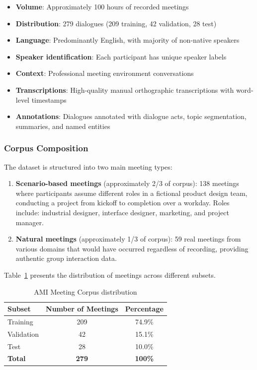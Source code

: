 \documentclass[12pt]{article}
\begin{document}
\begin{itemize}
    \item \textbf{Volume}: Approximately 100 hours of recorded meetings
    \item \textbf{Distribution}: 279 dialogues (209 training, 42 validation, 28 test)
    \item \textbf{Language}: Predominantly English, with majority of non-native speakers
    \item \textbf{Speaker identification}: Each participant has unique speaker labels
    \item \textbf{Context}: Professional meeting environment conversations
    \item \textbf{Transcriptions}: High-quality manual orthographic transcriptions with word-level timestamps
    \item \textbf{Annotations}: Dialogues annotated with dialogue acts, topic segmentation, summaries, and named entities
\end{itemize}

\subsubsection{Corpus Composition}

The dataset is structured into two main meeting types:

\begin{enumerate}
    \item \textbf{Scenario-based meetings} (approximately 2/3 of corpus): 138 meetings where participants assume different roles in a fictional product design team, conducting a project from kickoff to completion over a workday. Roles include: industrial designer, interface designer, marketing, and project manager.
    
    \item \textbf{Natural meetings} (approximately 1/3 of corpus): 59 real meetings from various domains that would have occurred regardless of recording, providing authentic group interaction data.
\end{enumerate}

Table~\ref{tab:ami_distribution} presents the distribution of meetings across different subsets.

\begin{table}[htb]
\centering
\caption{AMI Meeting Corpus distribution}
\label{tab:ami_distribution}
\begin{tabular}{lcc}
\toprule
\textbf{Subset} & \textbf{Number of Meetings} & \textbf{Percentage} \\
\midrule
Training & 209 & 74.9\% \\
Validation & 42 & 15.1\% \\
Test & 28 & 10.0\% \\
\midrule
\textbf{Total} & \textbf{279} & \textbf{100\%} \\
\bottomrule
\end{tabular}
\end{table}
\end{document}
